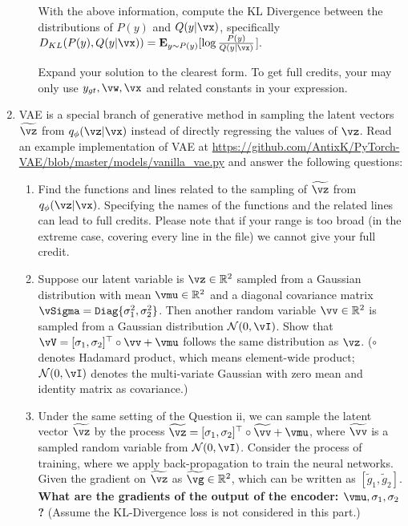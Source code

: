 \begin{Q}
\begin{enumerate}
\begin{enumerate}
    With the above information, compute the KL Divergence between the distributions of $P(y)$ and $Q(y|\vx)$, specifically $D_{KL}(P(y), Q(y|\vx))=\mathbf{E}_{y\sim P(y)}[\log\frac{P(y)}{Q(y|\vx)}$]. 
    
    Expand your solution to the clearest form. To get full credits, your may only use $y_{gt}, \vw, \vx$ and related constants in your expression.
\end{enumerate}

\item VAE is a special branch of generative method in sampling the latent vectors $\widetilde{\vz}$ from $q_{\phi}(\vz|\vx)$ instead of directly regressing the values of $\vz$. Read an example implementation of VAE at \url{https://github.com/AntixK/PyTorch-VAE/blob/master/models/vanilla_vae.py} and answer the following questions:

\begin{enumerate}
    \item Find the functions and lines related to the sampling of $\widetilde{\vz}$ from $q_{\phi}(\vz|\vx)$. Specifying the names of the functions and the related lines can lead to full credits. Please note that if your range is too broad (in the extreme case, covering every line in the file) we cannot give your full credit.
    
    \item
    Suppose our latent variable is $\vz\in\mathbb{R}^{2}$ sampled from a Gaussian distribution with mean $\vmu\in\mathbb{R}^2$ and a diagonal covariance matrix $\vSigma=\mathtt{Diag}\{\sigma_1^2, \sigma_2^2\}$. Then another random variable $\vv\in\mathbb{R}^2$ is sampled from a Gaussian distribution $\mathcal{N}(0, \vI)$. Show that $\vV = [\sigma_1, \sigma_2]^\top \circ \vv + \vmu$ follows the same distribution as $\vz$. ($\circ$ denotes Hadamard product, which means element-wide product; $\mathcal{N}(0, \vI)$ denotes the multi-variate Gaussian with zero mean and identity matrix as covariance.)
    
    \item
    Under the same setting of the Question ii, we can sample the latent vector $\widetilde{\vz}$ by the process $\widetilde{\vz}=[\sigma_1, \sigma_2]^\top \circ \widetilde{\vv} + \vmu$, where $\widetilde{\vv}$ is a sampled random variable from $\mathcal{N}(0, \vI)$. Consider the process of training, where we apply back-propagation to train the neural networks. Given the gradient on $\widetilde{\vz}$ as $\widetilde{\vg}\in\mathbb{R}^2$, which can be written as $[\widetilde{g}_1, \widetilde{g}_2]$. \textbf{What are the gradients of the output of the encoder: $\vmu, \sigma_1, \sigma_2$?} (Assume the KL-Divergence loss is not considered in this part.)
    

\end{enumerate}
\end{enumerate}
\end{Q}
